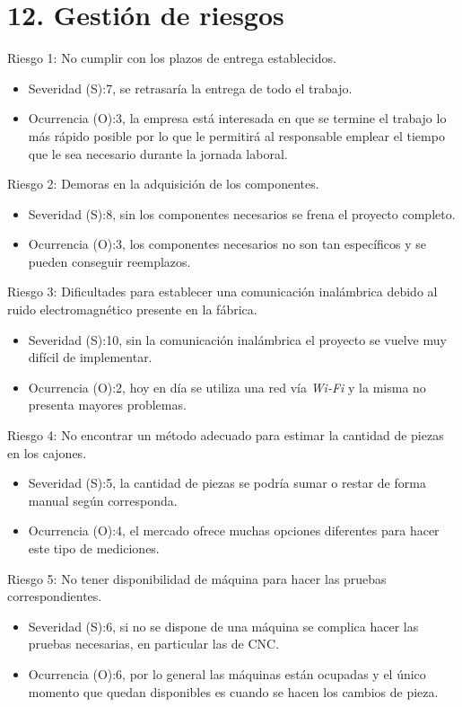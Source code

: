 \documentclass[11pt]{charter}
\begin{document}
\section{12. Gestión de riesgos}
\label{sec:riesgos}

Riesgo 1: No cumplir con los plazos de entrega establecidos.
\begin{itemize}
    \item Severidad (S):7, se retrasaría la entrega de todo el trabajo.
    \item Ocurrencia (O):3, la empresa está interesada en que se termine el trabajo lo más rápido posible por lo que le permitirá al responsable emplear el tiempo que le sea necesario durante la jornada laboral.
\end{itemize}

Riesgo 2: Demoras en la adquisición de los componentes.
\begin{itemize}
    \item Severidad (S):8, sin los componentes necesarios se frena el proyecto completo.
    \item Ocurrencia (O):3, los componentes necesarios no son tan específicos y se pueden conseguir reemplazos. 
\end{itemize}
Riesgo 3: Dificultades para establecer una comunicación inalámbrica debido al ruido electromagnético presente en la fábrica.
\begin{itemize}
    \item Severidad (S):10, sin la comunicación inalámbrica el proyecto se vuelve muy difícil de implementar.  
    \item Ocurrencia (O):2, hoy en día se utiliza una red vía \textit{Wi-Fi} y la misma no presenta mayores problemas.
\end{itemize}
Riesgo 4: No encontrar un método adecuado para estimar la cantidad de piezas en los cajones.
\begin{itemize}
    \item Severidad (S):5, la cantidad de piezas se podría sumar o restar de forma manual según corresponda.
    \item Ocurrencia (O):4, el mercado ofrece muchas opciones diferentes para hacer este tipo de mediciones.
\end{itemize}
Riesgo 5: No tener disponibilidad de máquina para hacer las pruebas correspondientes.
\begin{itemize}
    \item Severidad (S):6, si no se dispone de una máquina se complica hacer las pruebas necesarias, en particular las de CNC.
    \item Ocurrencia (O):6, por lo general las máquinas están ocupadas y el único momento que quedan disponibles es cuando se hacen los cambios de pieza.
\end{itemize}
\end{document}
